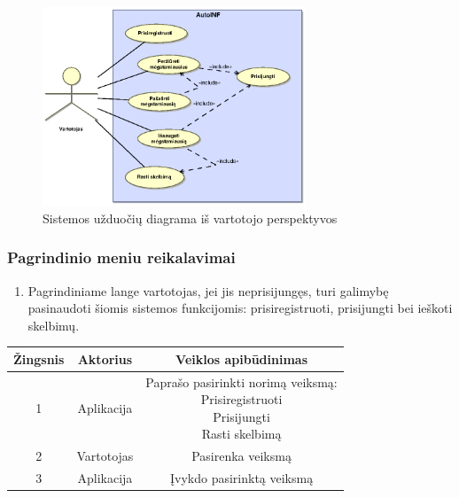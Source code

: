 \documentclass[12pt]{article}
\begin{document}
	\begin{figure}[h]
		\begin{center}
			\includegraphics[width=0.7\textwidth]{TikslaiVartotojas.eps}
			\caption{Sistemos užduočių diagrama iš vartotojo perspektyvos\label{UseCaseUser2}}
		\end{center}
	\end{figure}
	\pagebreak
	
	\subsubsection{Pagrindinio meniu reikalavimai}
	\begin{enumerate}[labelindent=10pt,leftmargin=2.2cm]
		\item Pagrindiniame lange vartotojas, jei jis neprisijungęs, turi galimybę pasinaudoti šiomis sistemos funkcijomis: prisiregistruoti, prisijungti bei ieškoti skelbimų.
	\end{enumerate}
		
		\begin{center}
		\begin{tabular}{ | c | c | c | }
			\hline
			Žingsnis & Aktorius   & Veiklos apibūdinimas \\ \hline
			1        & Aplikacija & \makecell{Paprašo pasirinkti norimą veiksmą: \\ Prisiregistruoti \\ Prisijungti \\ Rasti skelbimą} \\ \hline
			2        & Vartotojas & Pasirenka veiksmą \\ \hline
			3        & Aplikacija & Įvykdo pasirinktą veiksmą \\ \hline
		\end{tabular}
		\bigskip
		\end{center}
		
\end{document}
